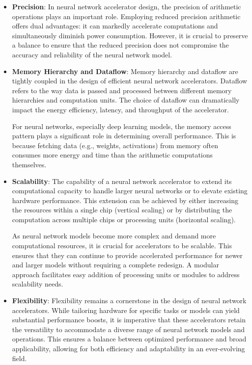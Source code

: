 \begin{itemize}
	\item \textbf{Precision}: In neural network accelerator design, the precision of arithmetic operations plays an important role. Employing reduced precision arithmetic offers dual advantages: it can markedly accelerate computations and simultaneously diminish power consumption. However, it is crucial to preserve a balance to ensure that the reduced precision does not compromise the accuracy and reliability of the neural network model.
	
	\item \textbf{Memory Hierarchy and Dataflow}: Memory hierarchy and dataflow are tightly coupled in the design of efficient neural network accelerators. Dataflow refers to the way data is passed and processed between different memory hierarchies and computation units. The choice of dataflow can dramatically impact the energy efficiency, latency, and throughput of the accelerator.
	
	For neural networks, especially deep learning models, the memory access pattern plays a significant role in determining overall performance. This is because fetching data (e.g., weights, activations) from memory often consumes more energy and time than the arithmetic computations themselves.
	\item \textbf{Scalability}: The capability of a neural network accelerator to extend its computational capacity to handle larger neural networks or to elevate existing hardware performance. This extension can be achieved by either increasing the resources within a single chip (vertical scaling) or by distributing the computation across multiple chips or processing units (horizontal scaling).
	
	As neural network models become more complex and demand more computational resources, it is crucial for accelerators to be scalable. This ensures that they can continue to provide accelerated performance for newer and larger models without requiring a complete redesign.
	A modular approach facilitates easy addition of processing units or modules to address scalability needs.
	\item \textbf{Flexibility}: Flexibility remains a cornerstone in the design of neural network accelerators. While tailoring hardware for specific tasks or models can yield substantial performance boosts, it is imperative that these accelerators retain the versatility to accommodate a diverse range of neural network models and operations. This ensures a balance between optimized performance and broad applicability, allowing for both efficiency and adaptability in an ever-evolving field.
	
\end{itemize}

